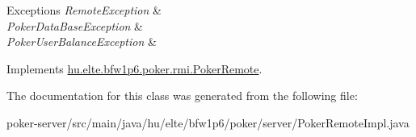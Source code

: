 \begin{DoxyExceptions}{Exceptions}
{\em Remote\+Exception} & \\
\hline
{\em Poker\+Data\+Base\+Exception} & \\
\hline
{\em Poker\+User\+Balance\+Exception} & \\
\hline
\end{DoxyExceptions}


Implements \hyperlink{interfacehu_1_1elte_1_1bfw1p6_1_1poker_1_1rmi_1_1_poker_remote_a95de0987012df23d93d886482d3f5528}{hu.\+elte.\+bfw1p6.\+poker.\+rmi.\+Poker\+Remote}.



The documentation for this class was generated from the following file\+:\begin{DoxyCompactItemize}
\item 
poker-\/server/src/main/java/hu/elte/bfw1p6/poker/server/Poker\+Remote\+Impl.\+java\end{DoxyCompactItemize}
